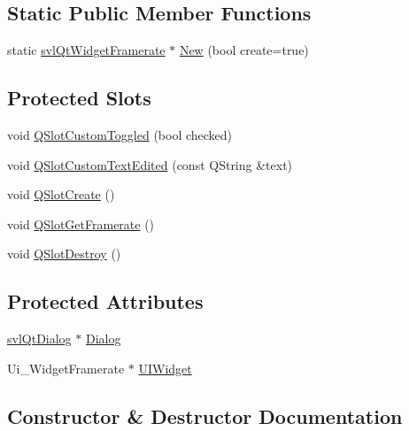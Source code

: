 \subsection*{Static Public Member Functions}
\begin{DoxyCompactItemize}
\item 
static \hyperlink{classsvl_qt_widget_framerate}{svl\+Qt\+Widget\+Framerate} $\ast$ \hyperlink{classsvl_qt_widget_framerate_ac6e8df71329947c02bd9fcb5a203d9fb}{New} (bool create=true)
\end{DoxyCompactItemize}
\subsection*{Protected Slots}
\begin{DoxyCompactItemize}
\item 
void \hyperlink{classsvl_qt_widget_framerate_aed76d7953edf20ba525495417a415493}{Q\+Slot\+Custom\+Toggled} (bool checked)
\item 
void \hyperlink{classsvl_qt_widget_framerate_ad6d6f1008d4bc878aa0cd710df3d54f9}{Q\+Slot\+Custom\+Text\+Edited} (const Q\+String \&text)
\item 
void \hyperlink{classsvl_qt_widget_framerate_a095e629724978a6b943b016ac9040f38}{Q\+Slot\+Create} ()
\item 
void \hyperlink{classsvl_qt_widget_framerate_aa81fead31d0456a43d59b271e43433b4}{Q\+Slot\+Get\+Framerate} ()
\item 
void \hyperlink{classsvl_qt_widget_framerate_ae5272c8d944b2a8728bd21cab3091436}{Q\+Slot\+Destroy} ()
\end{DoxyCompactItemize}
\subsection*{Protected Attributes}
\begin{DoxyCompactItemize}
\item 
\hyperlink{classsvl_qt_dialog}{svl\+Qt\+Dialog} $\ast$ \hyperlink{classsvl_qt_widget_framerate_afc4887261aa22c1ac02f67636a7f2210}{Dialog}
\item 
Ui\+\_\+\+Widget\+Framerate $\ast$ \hyperlink{classsvl_qt_widget_framerate_a40846f5133736383605f956be606b3c6}{U\+I\+Widget}
\end{DoxyCompactItemize}


\subsection{Constructor \& Destructor Documentation}
\hypertarget{classsvl_qt_widget_framerate_a46ce5fabc690f1cd4be48bce5a9a14c0}{}
